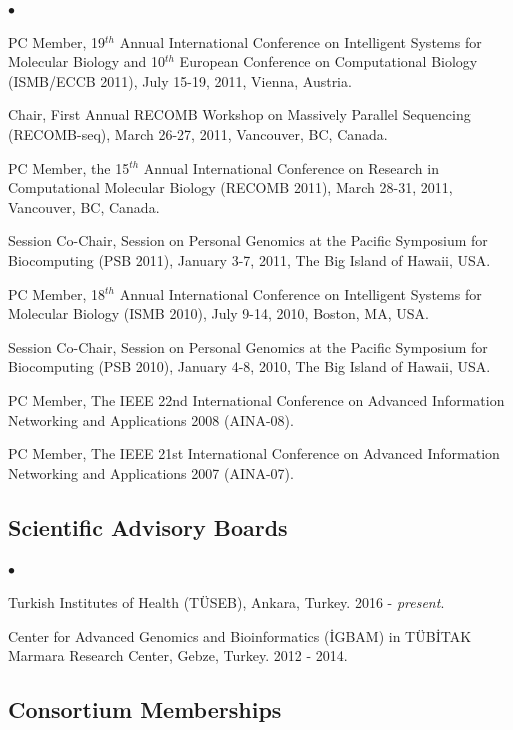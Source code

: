 \documentclass[margin,line]{res}
\newenvironment{list2}{
  \begin{list}{$\bullet$}{%
      \setlength{\itemsep}{0in}
      \setlength{\parsep}{0in} \setlength{\parskip}{0in}
      \setlength{\topsep}{0in} \setlength{\partopsep}{0in} 
      \setlength{\leftmargin}{0.2in}}}{\end{list}}
\begin{document}
\begin{resume}
\begin{list2}
\item
  PC Member, 19$^{th}$ Annual International Conference on Intelligent Systems for Molecular Biology
  and 10$^{th}$ European Conference on Computational Biology 
  (ISMB/ECCB 2011), July 15-19, 2011, Vienna, Austria.
\item
  Chair, First Annual RECOMB Workshop on Massively Parallel Sequencing (RECOMB-seq), March 26-27, 2011, Vancouver, BC, Canada.
\item
  PC Member, the 15$^{th}$ Annual International Conference on Research in Computational Molecular Biology
  (RECOMB 2011), March 28-31, 2011, Vancouver, BC, Canada.
\item 
  Session Co-Chair, Session on Personal Genomics at the Pacific Symposium for Biocomputing (PSB 2011),
  January 3-7, 2011, The Big Island of Hawaii, USA.
\item
  PC Member, 18$^{th}$ Annual International Conference on Intelligent Systems for Molecular Biology
  (ISMB 2010), July 9-14, 2010, Boston, MA, USA.
  \clearpage
\item 
  Session Co-Chair, Session on Personal Genomics at the Pacific Symposium for Biocomputing (PSB 2010),
  January 4-8, 2010, The Big Island of Hawaii, USA.
\item
  PC Member, The IEEE 22nd International Conference on
  Advanced Information Networking and Applications 2008 (AINA-08).
\item
  PC Member, The IEEE 21st International Conference on
  Advanced Information Networking and Applications 2007 (AINA-07).
\end{list2}


\vspace{-0.4cm}
\subsection{\small \sc Scientific Advisory Boards}
\begin{list2}
\item
  Turkish Institutes of Health (TÜSEB), Ankara, Turkey. 2016 - {\it present}.
\item
  Center for Advanced Genomics and Bioinformatics (\.{I}GBAM)
  in T\"{U}B\.{I}TAK Marmara Research Center, Gebze, Turkey. 2012 - 2014.
\end{list2}

\vspace{-0.4cm}
\subsection{\small \sc Consortium Memberships}


\end{resume}
\end{document}
